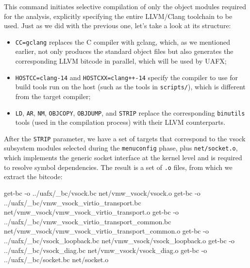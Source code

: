 
\noindent This command initiates selective compilation of only the object modules required for the analysis, explicitly specifying the entire LLVM/Clang toolchain to be used. Just as we did with the previous one, let's take a look at its structure:

\begin{itemize}
    \item \texttt{CC=gclang} replaces the C compiler with gclang, which, as we mentioned earlier, not only produces the standard object files but also generates the corresponding LLVM bitcode in parallel, which will be used by UAFX;

    \item \texttt{HOSTCC=clang-14} and \texttt{HOSTCXX=clang++-14} specify the compiler to use for build tools run on the host (such as the tools in \texttt{scripts/}), which is different from the target compiler;

    \item \texttt{LD}, \texttt{AR}, \texttt{NM}, \texttt{OBJCOPY}, \texttt{OBJDUMP}, and \texttt{STRIP} replace the corresponding \texttt{binutils} tools (used in the compilation process) with their LLVM counterparts.
\end{itemize}

\noindent After the \texttt{STRIP} parameter, we have a set of targets that correspond to the vsock subsystem modules selected during the \texttt{menuconfig} phase, plus \texttt{net/socket.o}, which implements the generic socket interface at the kernel level and is required to resolve symbol dependencies. The result is a set of \texttt{.o} files, from which we extract the bitcode:

\begin{bashlncode}
get-bc -o 
    ../uafx/_bc/vsock.bc
    net/vmw_vsock/vsock.o
get-bc -o
    ../uafx/_bc/vmw_vsock_virtio_transport.bc
    net/vmw_vsock/vmw_vsock_virtio_transport.o
get-bc -o
    ../uafx/_bc/vmw_vsock_virtio_transport_common.bc
    net/vmw_vsock/vmw_vsock_virtio_transport_common.o
get-bc -o
    ../uafx/_bc/vsock_loopback.bc
    net/vmw_vsock/vsock_loopback.o
get-bc -o
    ../uafx/_bc/vsock_diag.bc
    net/vmw_vsock/vsock_diag.o
get-bc -o
    ../uafx/_bc/socket.bc
    net/socket.o
\end{bashlncode}

